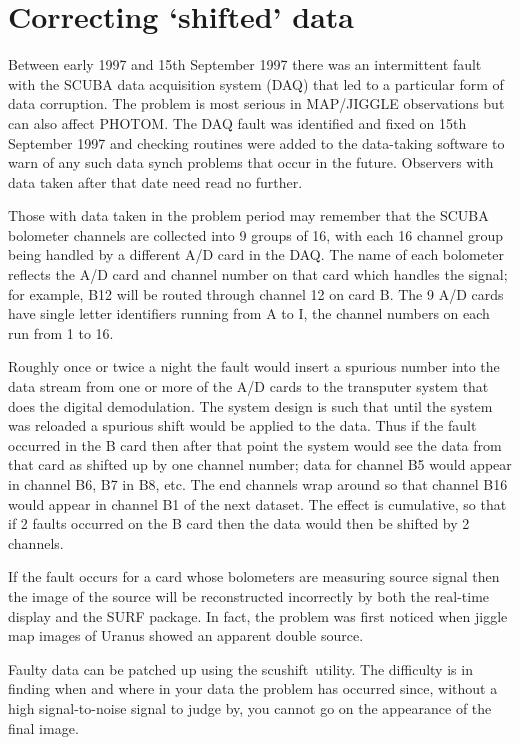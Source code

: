 \documentclass[twoside,11pt]{article}
\newcommand{\task}[1]{{\sf #1}}
\newcommand{\scushift}{\htmlref{\task{scushift}}{SCUSHIFT}}
\newcommand{\htmlref}[2]{#1}
\renewcommand{\_}{\texttt{\symbol{95}}}
\begin{document}
\section{Correcting `shifted' data}

Between early 1997 and 15th September 1997 there was an intermittent fault
with the SCUBA data acquisition system (DAQ) that led to a particular form of
data corruption. The problem is most serious in MAP/JIGGLE observations but
can also affect PHOTOM. The DAQ fault was identified and fixed on 15th
September 1997 and checking routines were added to the data-taking software to
warn of any such data synch problems that occur in the future.  Observers with
data taken after that date need read no further.

Those with data taken in the problem period may remember that the
SCUBA bolometer channels are collected into 9 groups of 16, with each 16
channel group being handled by a different A/D card in the DAQ. The name
of each bolometer reflects the A/D card and channel number on that card
which handles the signal; for example, B12 will be routed through channel
12 on card B. The 9 A/D cards have single letter identifiers running from
A to I, the channel numbers on each run from 1 to 16.

Roughly once or twice a night the fault would insert a spurious number
into the data stream from one or more of the A/D cards to the transputer
system that does the digital demodulation. The system design is such that
until the system was reloaded a spurious shift would be applied to the
data. Thus if the fault occurred in the B card then after that point the
system would see the data from that card as shifted up by one channel
number; data for channel B5 would appear in channel B6, B7 in B8, etc. The
end channels wrap around so that channel B16 would appear in channel B1 of
the next dataset. The effect is cumulative, so that if 2 faults occurred
on the B card then the data would then be shifted by 2 channels.

If the fault occurs for a card whose bolometers are measuring source
signal then the image of the source will be reconstructed incorrectly by
both the real-time display and the SURF package. In fact, the problem was
first noticed when jiggle map images of Uranus showed an apparent double
source.

Faulty data can be patched up using the \scushift\  utility. The difficulty is 
in finding when and where in your data the problem has occurred since,
without a high signal-to-noise signal to judge by, you cannot go on the
appearance of the final image.
\end{document}
